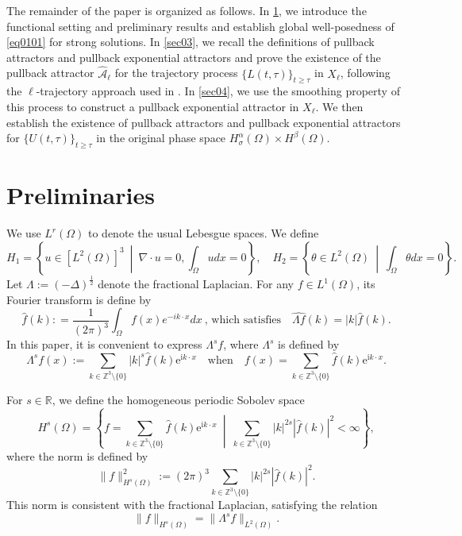 \documentclass[oneside,preprint,12pt,numbers,sort&compress]{elsarticle}
\begin{document}
The remainder of the paper is organized as follows. In \cref{sec02}, we introduce the functional setting and preliminary results and establish global well-posedness of \cref{eq0101} for strong solutions. In \cref{sec03}, we recall the definitions of pullback attractors and pullback exponential attractors and prove the existence of the pullback attractor $\hat{\mathcal{A}}_\ell$ for the trajectory process $\{L(t,\tau)\}_{t\geq\tau}$ in $X_\ell$, following the $\ell$-trajectory approach used in \cite{LY2020,AT2021,YouB2021,YouB2023,AS2024}. In \cref{sec04}, we use the smoothing property of this process to construct a pullback exponential attractor in $X_\ell$. We then establish the existence of pullback attractors and pullback exponential attractors for $\{U(t,\tau)\}_{t\geq\tau}$ in the original phase space $H_\sigma^\alpha(\Omega)\times H^\beta(\Omega)$.



\section{Preliminaries}\label{sec02}
We use $L^r(\Omega)$ to denote the usual Lebesgue spaces. We define 
$$H_{1}=\left\{u\in [L^{2}(\Omega)]^{3}\ \middle|\ \nabla\cdot u = 0, \int_{\Omega}u dx=0\right\}, \quad H_{2}=\left\{\theta\in L^{2}(\Omega)\ \middle|\ \int_{\Omega}\theta dx=0\right\}.$$
Let $\Lambda :=(-\Delta)^{\frac{1}{2}}$ denote the fractional Laplacian. For any $f\in L^{1}(\Omega)$, its Fourier transform is define by
$$ \widehat{f}(k): = \frac{1}{(2\pi)^3} \int_{\Omega} f(x) e^{-ik \cdot x}dx \ \text{, which satisfies} \quad \widehat{\Lambda f}(k) = |k| \widehat{f}(k).$$
In this paper, it is convenient to express $\Lambda^s f$, where $\Lambda^s$ is defined by
\begin{equation*}
\Lambda^s f(x):= \sum_{k \in \mathbb{Z}^3 \setminus \{0\}} |k|^s \widehat{f}(k) \mathrm{e}^{\mathrm{i} k \cdot x} \quad \text{when} \quad f(x)= \sum_{k \in \mathbb{Z}^3 \setminus \{0\}} \widehat{f}(k) \mathrm{e}^{\mathrm{i} k \cdot x}.
\end{equation*}

For $s \in \mathbb{R}$, we define the homogeneous periodic Sobolev space 
\begin{equation*}
H^s(\Omega) = \left\{ f= \sum_{k \in \mathbb{Z}^3 \setminus \{0\}} \widehat{f}(k) \mathrm{e}^{\mathrm{i} k \cdot x}\ \middle|\ \sum_{k \in \mathbb{Z}^3\setminus \{0\}} |k|^{2s} |\widehat{f}(k)|^2 < \infty \right\},
\end{equation*}
where the norm is defined by
\begin{equation*}
\| f \|_{H^s(\Omega)}^2 := (2\pi)^3 \sum_{k \in \mathbb{Z}^3 \setminus \{0\}} |k|^{2s} |\widehat{f}(k)|^2.
\end{equation*}
This norm is consistent with the fractional Laplacian, satisfying the relation
$$
\| f \|_{H^s(\Omega)} = \| \Lambda^s f \|_{L^2(\Omega)}.
$$
\end{document}

